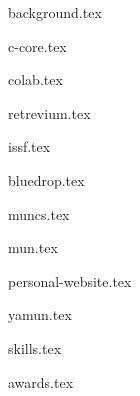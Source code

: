 \documentclass[11pt]{article}
\begin{document}
{background.tex}


{c-core.tex}

{colab.tex}

{retrevium.tex}

{issf.tex}

{bluedrop.tex}

{muncs.tex}


{mun.tex}


{personal-website.tex}

{yamun.tex}


{skills.tex}


{awards.tex}
\end{document}
